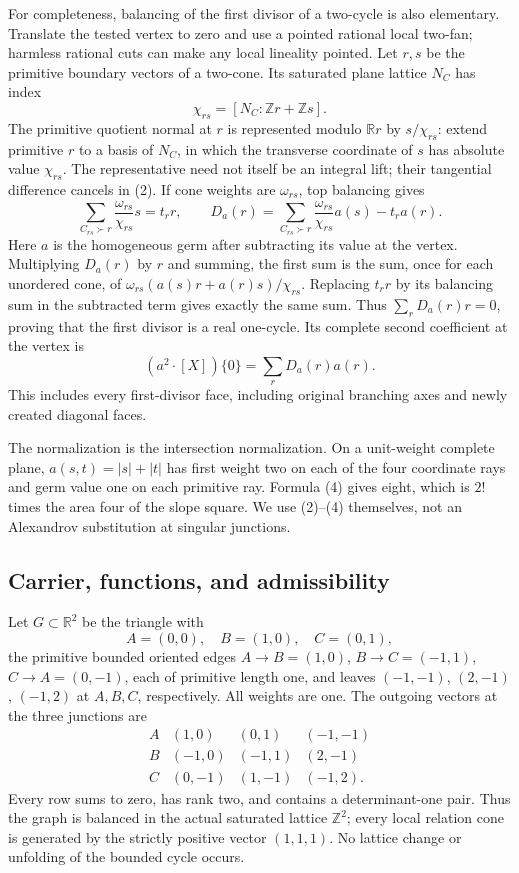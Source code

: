 \documentclass[
  10pt,
]{article}
\begin{document}
For completeness, balancing of the first divisor of a two-cycle is also
elementary. Translate the tested vertex to zero and use a pointed
rational local two-fan; harmless rational cuts can make any local
lineality pointed. Let \(r,s\) be the primitive boundary vectors of a
two-cone. Its saturated plane lattice \(N_C\) has index \[
 \chi_{rs}=[N_C:\mathbb Zr+\mathbb Zs].
\] The primitive quotient normal at \(r\) is represented modulo
\(\mathbb Rr\) by \(s/\chi_{rs}\): extend primitive \(r\) to a basis of
\(N_C\), in which the transverse coordinate of \(s\) has absolute value
\(\chi_{rs}\). The representative need not itself be an integral lift;
their tangential difference cancels in (2). If cone weights are
\(\omega_{rs}\), top balancing gives \[
 \sum_{C_{rs}\succ r}\frac{\omega_{rs}}{\chi_{rs}}s=t_r r,
 \qquad
 D_a(r)=\sum_{C_{rs}\succ r}\frac{\omega_{rs}}{\chi_{rs}}a(s)-t_ra(r).
 \tag{3}
\] Here \(a\) is the homogeneous germ after subtracting its value at the
vertex. Multiplying \(D_a(r)\) by \(r\) and summing, the first sum is
the sum, once for each unordered cone, of
\(\omega_{rs}(a(s)r+a(r)s)/\chi_{rs}\). Replacing \(t_rr\) by its
balancing sum in the subtracted term gives exactly the same sum. Thus
\(\sum_rD_a(r)r=0\), proving that the first divisor is a real one-cycle.
Its complete second coefficient at the vertex is \[
                      (a^2\cdot[X])\{0\}=\sum_rD_a(r)a(r).
 \tag{4}
\] This includes every first-divisor face, including original branching
axes and newly created diagonal faces.

The normalization is the intersection normalization. On a unit-weight
complete plane, \(a(s,t)=|s|+|t|\) has first weight two on each of the
four coordinate rays and germ value one on each primitive ray. Formula
(4) gives eight, which is \(2!\) times the area four of the slope
square. We use (2)--(4) themselves, not an Alexandrov substitution at
singular junctions.

\subsection{Carrier, functions, and
admissibility}\label{carrier-functions-and-admissibility}

Let \(G\subset\mathbb R^2\) be the triangle with \[
 A=(0,0),\quad B=(1,0),\quad C=(0,1),
\] the primitive bounded oriented edges \(A\to B=(1,0)\),
\(B\to C=(-1,1)\), \(C\to A=(0,-1)\), each of primitive length one, and
leaves \((-1,-1)\), \((2,-1)\), \((-1,2)\) at \(A,B,C\), respectively.
All weights are one. The outgoing vectors at the three junctions are \[
\begin{array}{c|ccc}
 A&(1,0)&(0,1)&(-1,-1)\\
 B&(-1,0)&(-1,1)&(2,-1)\\
 C&(0,-1)&(1,-1)&(-1,2).
\end{array}
\] Every row sums to zero, has rank two, and contains a determinant-one
pair. Thus the graph is balanced in the actual saturated lattice
\(\mathbb Z^2\); every local relation cone is generated by the strictly
positive vector \((1,1,1)\). No lattice change or unfolding of the
bounded cycle occurs.
\end{document}
